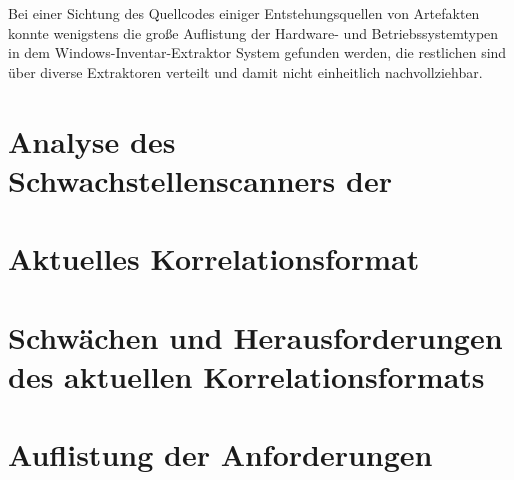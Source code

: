 Bei einer Sichtung des Quellcodes einiger Entstehungsquellen von Artefakten konnte wenigstens die große Auflistung der Hardware- und Betriebssystemtypen in dem Windows-Inventar-Extraktor System gefunden werden, die restlichen sind über diverse Extraktoren verteilt und damit nicht einheitlich nachvollziehbar.

\section{Analyse des Schwachstellenscanners der \metaeffektlg}



\section{Aktuelles Korrelationsformat}


\section{Schwächen und Herausforderungen des aktuellen Korrelationsformats}


\section{Auflistung der Anforderungen}

